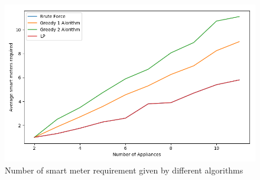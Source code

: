 \begin{figure} 
	\centering
	\includegraphics[width=1\linewidth]{images/optsens}
	\caption[Number of smart meter requirement given by different algorithms]{Number of smart meter requirement given by different algorithms}
	\label{fig:optsens}
	\vspace*{-3ex}
\end{figure}
